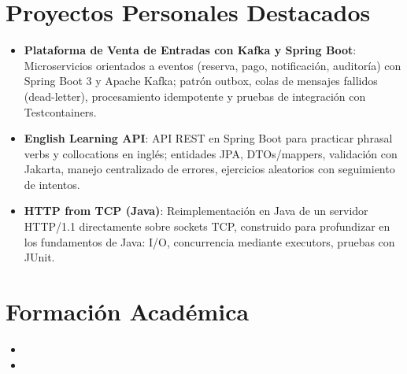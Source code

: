 \documentclass[11pt,a4paper,sans]{moderncv}
\begin{document}
\section{Proyectos Personales Destacados}
\vspace{1pt}
\begin{itemize}

\item \textbf{Plataforma de Venta de Entradas con Kafka y Spring Boot}: Microservicios orientados a eventos (reserva, pago, notificación, auditoría) con Spring Boot 3 y Apache Kafka; patrón outbox, colas de mensajes fallidos (dead-letter), procesamiento idempotente y pruebas de integración con Testcontainers.

\item \textbf{English Learning API}: API REST en Spring Boot para practicar phrasal verbs y collocations en inglés; entidades JPA, DTOs/mappers, validación con Jakarta, manejo centralizado de errores, ejercicios aleatorios con seguimiento de intentos.

\item \textbf{HTTP from TCP (Java)}: Reimplementación en Java de un servidor HTTP/1.1 directamente sobre sockets TCP, construido para profundizar en los fundamentos de Java: I/O, concurrencia mediante executors, pruebas con JUnit.

\end{itemize}


\section{Formación Académica}
\vspace{1pt}
\begin{itemize}

\item{}

\vspace{3pt}

\item{}

\end{itemize}
\end{document}
